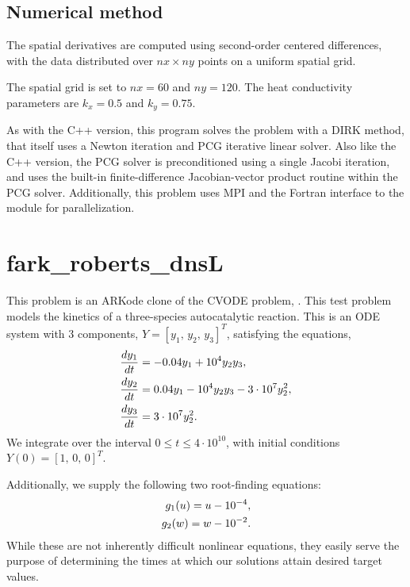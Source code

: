 \documentclass[letterpaper,10pt,english]{sphinxmanual}
\begin{document}
\section{Numerical method}
\label{fark_heat2D:numerical-method}
The spatial derivatives are computed using second-order
centered differences, with the data distributed over $nx\times
ny$ points on a uniform spatial grid.

The spatial grid is set to $nx=60$ and $ny=120$.  The heat
conductivity parameters are $k_x=0.5$ and $k_y=0.75$.

As with the C++ version, this program solves the problem with a DIRK
method, that itself uses a Newton iteration and PCG iterative linear
solver.  Also like the C++ version, the PCG solver is preconditioned
using a single Jacobi iteration, and uses the built-in
finite-difference Jacobian-vector product routine within the PCG
solver.  Additionally, this problem uses MPI and the Fortran interface
to the  module for parallelization.


\chapter{fark\_roberts\_dnsL}
\label{fark_roberts_dnsL::doc}\label{fark_roberts_dnsL:fark-roberts-dnsl}\label{fark_roberts_dnsL:id1}
This problem is an ARKode clone of the CVODE problem,
.  This test problem models the kinetics of a
three-species autocatalytic reaction.  This is an ODE system with 3
components, $Y = [y_1,\, y_2,\, y_3]^T$, satisfying the equations,
\begin{gather}
\begin{split}\frac{d y_1}{dt} &= -0.04 y_1 + 10^4 y_2 y_3, \\
\frac{d y_2}{dt} &= 0.04 y_1 - 10^4 y_2 y_3 - 3\cdot10^7 y_2^2, \\
\frac{d y_3}{dt} &= 3\cdot10^7 y_2^2.\end{split}\notag
\end{gather}
We integrate over the interval $0\le t\le 4\cdot10^{10}$, with initial
conditions  $Y(0) = [1,\, 0,\, 0]^T$.

Additionally, we supply the following two root-finding equations:
\begin{gather}
\begin{split}g_1(u) = u - 10^{-4}, \\
g_2(w) = w - 10^{-2}.\end{split}\notag
\end{gather}
While these are not inherently difficult nonlinear equations, they
easily serve the purpose of determining the times at which our
solutions attain desired target values.
\end{document}
